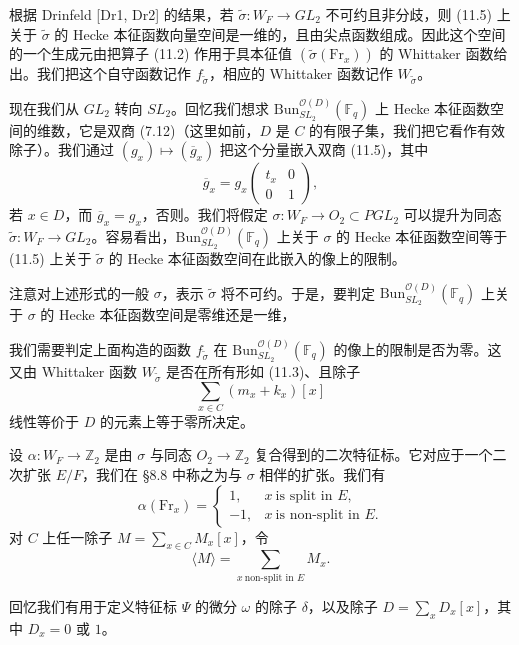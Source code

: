 \documentclass[11pt,a4paper]{article}
\newcommand{\Bun}{\mathrm{Bun}}
\begin{document}
根据 Drinfeld [Dr1, Dr2] 的结果，若 $\tilde\sigma: W_F\to GL_2$ 不可约且非分歧，则 (11.5) 上关于 $\tilde\sigma$ 的 Hecke 本征函数向量空间是一维的，且由尖点函数组成。因此这个空间的一个生成元由把算子 (11.2) 作用于具本征值 $(\tilde\sigma(\mathrm{Fr}_x))$ 的 Whittaker 函数给出。我们把这个自守函数记作 $f_{\tilde\sigma}$，相应的 Whittaker 函数记作 $W_{\tilde\sigma}$。

现在我们从 $GL_2$ 转向 $SL_2$。回忆我们想求 $\Bun^{\mathcal{O}(D)}_{SL_2}(\mathbb{F}_q)$ 上 Hecke 本征函数空间的维数，它是双商 (7.12)（这里如前，$D$ 是 $C$ 的有限子集，我们把它看作有效除子）。我们通过 $(g_x)\mapsto(\overline{g}_x)$ 把这个分量嵌入双商 (11.5)，其中
\[
\overline{g}_x = g_x\begin{pmatrix}t_x&0\\ 0&1\end{pmatrix},
\]
若 $x\in D$，而 $\overline{g}_x=g_x$，否则。我们将假定 $\sigma: W_F\to O_2\subset PGL_2$ 可以提升为同态 $\tilde\sigma: W_F\to GL_2$。容易看出，$\Bun^{\mathcal{O}(D)}_{SL_2}(\mathbb{F}_q)$ 上关于 $\sigma$ 的 Hecke 本征函数空间等于 (11.5) 上关于 $\tilde\sigma$ 的 Hecke 本征函数空间在此嵌入的像上的限制。

注意对上述形式的一般 $\sigma$，表示 $\tilde\sigma$ 将不可约。于是，要判定 $\Bun^{\mathcal{O}(D)}_{SL_2}(\mathbb{F}_q)$ 上关于 $\sigma$ 的 Hecke 本征函数空间是零维还是一维，


我们需要判定上面构造的函数 $f_{\tilde\sigma}$ 在 $\Bun^{\mathcal{O}(D)}_{SL_2}(\mathbb{F}_q)$ 的像上的限制是否为零。这又由 Whittaker 函数 $W_{\tilde\sigma}$ 是否在所有形如 (11.3)、且除子
\[
\sum_{x\in C}(m_x+k_x)[x]
\]
线性等价于 $D$ 的元素上等于零所决定。

设 $\alpha: W_F\to\mathbb{Z}_2$ 是由 $\sigma$ 与同态 $O_2\to\mathbb{Z}_2$ 复合得到的二次特征标。它对应于一个二次扩张 $E/F$，我们在 §8.8 中称之为与 $\sigma$ 相伴的扩张。我们有
\[
\alpha(\mathrm{Fr}_x)=\begin{cases}1,&x\ \text{is split in }E,\\ -1,&x\ \text{is non-split in }E.\end{cases}
\]
对 $C$ 上任一除子 $M=\sum_{x\in C}M_x[x]$，令
\[
\langle M\rangle = \sum_{x\ \text{non-split in }E}M_x.
\]

回忆我们有用于定义特征标 $\Psi$ 的微分 $\omega$ 的除子 $\delta$，以及除子 $D=\sum_x D_x[x]$，其中 $D_x=0$ 或 $1$。
\end{document}
